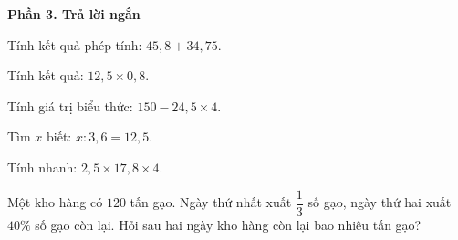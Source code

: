 \textbf{Phần 3. Trả lời ngắn}

\begin{ex} %
Tính kết quả phép tính: $45{,}8 + 34{,}75$.
\end{ex}

\begin{ex} %
Tính kết quả: $12{,}5 \times 0{,}8$.
\end{ex}

\begin{ex} %
Tính giá trị biểu thức: $150 - 24{,}5 \times 4$.
\end{ex}

\begin{ex} %
Tìm $x$ biết: $x : 3{,}6 = 12{,}5$.
\end{ex}

\begin{ex} %
Tính nhanh: $2{,}5 \times 17{,}8 \times 4$.
\end{ex}

\begin{ex} %
Một kho hàng có $120$ tấn gạo. Ngày thứ nhất xuất $\dfrac{1}{3}$ số gạo, ngày thứ hai xuất $40\%$ số gạo còn lại. Hỏi sau hai ngày kho hàng còn lại bao nhiêu tấn gạo?
\end{ex}
